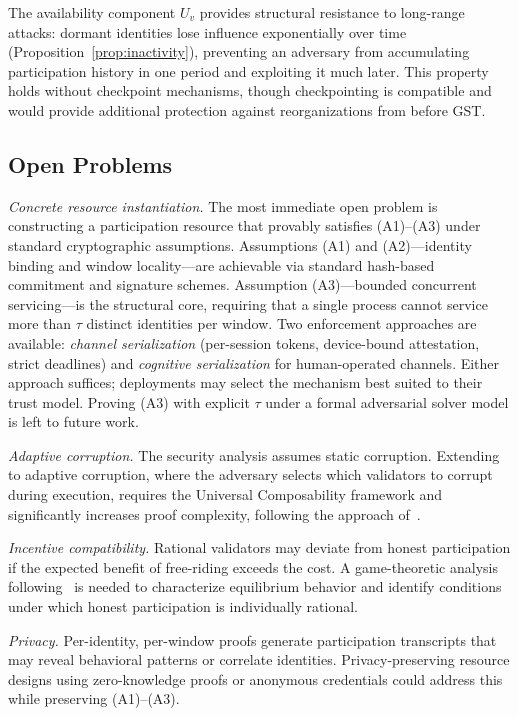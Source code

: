 \documentclass[10pt,journal,twoside]{IEEEtran}
\theoremstyle{remark}
\begin{document}
	The availability component $U_v$ provides structural
	resistance to long-range attacks: dormant identities lose
	influence exponentially over time
	(Proposition~\ref{prop:inactivity}), preventing an
	adversary from accumulating participation history in one
	period and exploiting it much later.
	This property holds without checkpoint mechanisms, though
	checkpointing is compatible and would provide additional
	protection against reorganizations from before GST.
	
	\subsection{Open Problems}
	\label{ssec:disc-open}
	
	\emph{Concrete resource instantiation.}
	The most immediate open problem is constructing a
	participation resource that provably satisfies
	(A1)--(A3) under standard cryptographic assumptions.
	Assumptions (A1) and (A2)---identity binding and
	window locality---are achievable via standard hash-based
	commitment and signature schemes.
	Assumption (A3)---bounded concurrent servicing---is the
	structural core, requiring that a single process cannot
	service more than $\tau$ distinct identities per window.
	Two enforcement approaches are available:
	\emph{channel serialization} (per-session tokens,
	device-bound attestation, strict deadlines) and
	\emph{cognitive serialization} for human-operated channels.
	Either approach suffices; deployments may select the
	mechanism best suited to their trust model.
	Proving (A3) with explicit $\tau$ under a formal
	adversarial solver model is left to future work.
	
	\emph{Adaptive corruption.}
	The security analysis assumes static corruption.
	Extending to adaptive corruption, where the adversary
	selects which validators to corrupt during execution,
	requires the Universal Composability framework and
	significantly increases proof complexity, following the
	approach of~\cite{badertscher2021stake}.
	
	\emph{Incentive compatibility.}
	Rational validators may deviate from honest participation
	if the expected benefit of free-riding exceeds the cost.
	A game-theoretic analysis following~\cite{bonneau2015sok,
		budish2024economic} is needed to characterize
	equilibrium behavior and identify conditions under which
	honest participation is individually rational.
	
	\emph{Privacy.}
	Per-identity, per-window proofs generate participation
	transcripts that may reveal behavioral patterns or
	correlate identities.
	Privacy-preserving resource designs using zero-knowledge
	proofs or anonymous credentials could address this while
	preserving (A1)--(A3).
	
\end{document}
